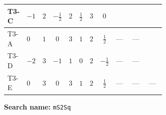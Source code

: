 \documentclass[8pt]{article}
\begin{document}
\begin{landscape}
\begin{longtable}{@{}llcccccc >{\raggedright\arraybackslash}p{0.21\linewidth} >{\raggedright\arraybackslash}p{0.21\linewidth} >{\raggedright\arraybackslash}p{0.21\linewidth}@{}}
\midrule
T3-C & $-1$ & $2$ & $-\frac{1}{2}$ & $2$ & $\frac{1}{2}$ & $3$ & $0$ & \scriptsize\adjustbox{max width=\linewidth}{$\begin{gathered} -\frac{9 {g_2}^2 {m_{S_2}^2}}{2}\end{gathered}$} & \scriptsize\adjustbox{max width=\linewidth}{$\begin{gathered} -\frac{3 {g_Y}^2 {m_{S_2}^2}}{2}\end{gathered}$} & \scriptsize\adjustbox{max width=\linewidth}{$\begin{gathered} +4 {\lambda_{12}} {m_{S_1}^2}\end{gathered}$} \\
\midrule
T3-A & $0$ & $1$ & $0$ & $3$ & $1$ & $2$ & $\frac{1}{2}$ & --- & --- & \scriptsize\adjustbox{max width=\linewidth}{$\begin{gathered} +2 {\lambda_{12}} {m_{S_1}^2}\end{gathered}$} \\
\midrule
T3-D & $-2$ & $3$ & $-1$ & $1$ & $0$ & $2$ & $-\frac{1}{2}$ & --- & --- & \scriptsize\adjustbox{max width=\linewidth}{$\begin{gathered} 6 {\lambda_{12}} {m_{S_1}^2}\end{gathered}$} \\
\midrule
T3-E & $0$ & $3$ & $0$ & $3$ & $1$ & $2$ & $\frac{1}{2}$ & --- & --- & --- \\
\midrule
\bottomrule
\end{longtable}
\clearpage
\noindent\textbf{Search name: }\texttt{mS2Sq}\par\smallskip

\end{landscape}
\end{document}
